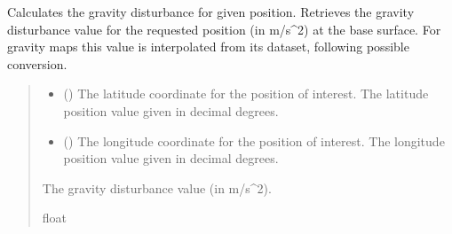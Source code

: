 \documentclass[letterpaper,10pt,english]{sphinxmanual}
\begin{document}
\begin{fulllineitems}
\begin{fulllineitems}
\label{\detokenize{modules/gravity/irish:qnav.gravity.irish.IrishSeaGravity.get_disturbance}}
\pysigstartsignatures
{}
\pysigstopsignatures
\sphinxAtStartPar
Calculates the gravity disturbance for given position.
Retrieves the gravity disturbance value for the requested position
(in m/s\textasciicircum{}2) at the base surface. For gravity maps this value is
interpolated from its dataset, following possible conversion.
\begin{quote}\begin{description}
\begin{itemize}
\item {} 
\sphinxAtStartPar
{} () \textendash{} The latitude coordinate for the position of interest.
The latitude position value given in decimal degrees.

\item {} 
\sphinxAtStartPar
{} () \textendash{} The longitude coordinate for the position of interest.
The longitude position value given in decimal degrees.

\end{itemize}

\sphinxAtStartPar
The gravity disturbance value (in m/s\textasciicircum{}2).

\sphinxAtStartPar
float

\end{description}\end{quote}

\end{fulllineitems}



\end{fulllineitems}
\end{document}
